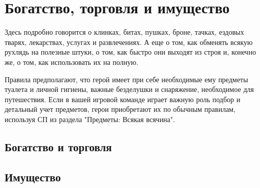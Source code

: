 \chapter{Богатство, торговля и имущество}
Здесь подробно говорится о клинках, битах, пушках, броне, тачках, ездовых тварях, лекарствах, услугах и развлечениях. А еще о том, как обменять всякую рухлядь на полезные штуки, о том, как быстро они выходят из строя и, конечно же, о том, как использовать их на полную.
\begin{tcolorbox}
    Правила предполагают, что герой имеет при себе необходимые ему предметы туалета и личной гигиены, важные безделушки и снаряжение, необходимое для путешествия. Если в вашей игровой команде играет важную роль подбор и детальный учет предметов, герои приобретают их по обычным правилам, используя СП из раздела "Предметы: Всякая всячина".
\end{tcolorbox}

\section{Богатство и торговля}

\section{Имущество}





\earlyEnd

\earlyEnd

\earlyEnd

